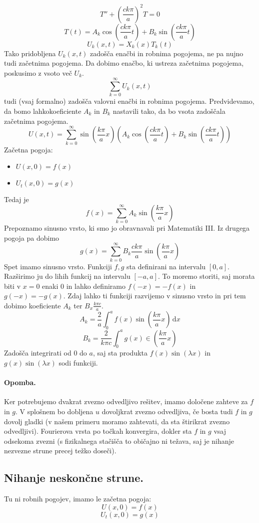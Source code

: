 \documentclass[a4paper]{article}
\newcommand{\dif}{\mathrm{d}}
\newcommand{\Sum}[2][0]{\sum_{{#2} = {#1}}^{\infty}}
\begin{document}
$$T'' + \left(\frac{ck\pi}{a}\right)^2T = 0$$
$$T(t) = A_k \cos\left(\frac{ck\pi}{a}t\right) + B_k \sin\left(\frac{ck\pi}{a}t\right)$$
$$U_k(x, t) = X_k(x)T_k(t)$$
Tako pridobljena $U_k(x, t)$ zadošča enačbi in robnima pogojema, ne pa nujno tudi začetnima pogojema. Da dobimo enačbo, ki ustreza začetnima pogojema, poskusimo z vsoto več $U_k$.
$$\Sum{k} U_k(x, t)$$
tudi (vsaj formalno) zadošča valovni enačbi in robnima pogojema. Predvidevamo, da bomo lahkokoeficiente $A_k$ in $B_k$ nastavili tako, da bo vsota zadoščala začetnima pogojema.
$$U(x, t) = \Sum{k} \sin\left(\frac{k\pi}{a}x\right)\left(A_k\cos\left(\frac{ck\pi}{a}t\right) + B_k\sin\left(\frac{ck\pi}{a}t\right)\right)$$
Začetna pogoja:
\begin{itemize}
    \item $U(x, 0) = f(x)$
    \item $U_t(x, 0) = g(x)$
\end{itemize}
Tedaj je $$f(x) = \Sum{k}A_k\sin\left(\frac{k\pi}{a}x\right)$$
Prepoznamo sinusno vrsto, ki smo jo obravnavali pri Matematiki III. Iz drugega pogoja pa dobimo
$$g(x) = \Sum{k} B_k \frac{ck\pi}{a}\sin\left(\frac{k\pi}{a}x\right)$$
Spet imamo sinusno vrsto. Funkciji $f, g$ sta definirani na intervalu $[0, a]$. Razširimo ju do lihih funkcij na intervalu $[-a, a]$. To moremo storiti, saj morata biti v $x=0$ enaki $0$ in lahko definiramo $f(-x) = -f(x)$ in $g(-x) = -g(x)$.
Zdaj lahko ti funkciji razvijemo v sinusno vrsto in pri tem dobimo koeficiente $A_k$ ter $\displaystyle{B_x\frac{k\pi c}{a}}$.
$$A_k = \frac{2}{a}\int_{0}^{a} f(x)\sin\left(\frac{k\pi}{a}x\right)\,\dif x$$
$$B_k = \frac{2}{k\pi c}\int_{0}^{a}g(x)\in\left(\frac{k\pi}{a}x\right)$$
Zadošča integrirati od $0$ do $a$, saj sta produkta $f(x)\sin(\lambda x)$ in $g(x)\sin(\lambda x)$ sodi funkciji.
\paragraph{Opomba.} Ker potrebujemo dvakrat zvezno odvedljivo rešitev, imamo določene zahteve za $f$ in $g$.
V splošnem bo dobljena $u$ dovoljkrat zvezno odvedljiva, če bosta tudi $f$ in $g$ dovolj gladki
(v našem primeru moramo zahtevati, da sta štirikrat zvezno odvedljivi). Fourierova vrsta po točkah konvergira, dokler sta $f$ in $g$ vsaj odsekoma zvezni
(s fizikalnega stačišča to običajno ni težava, saj je nihanje nezvezne strune precej težko doseči).
\subsection{Nihanje neskončne strune.} Tu ni robnih pogojev, imamo le začetna pogoja:
$$U(x, 0) = f(x)$$
$$U_t(x, 0) = g(x)$$
\end{document}
